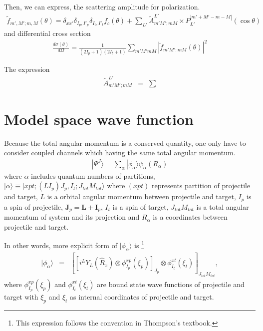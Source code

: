 \documentclass[11pt]{book}
\def\bm{\boldsymbol}
\def\ra{\rangle}
\newcommand{\bea}{\begin{eqnarray}}
\newcommand{\eea}{\end{eqnarray}}
\begin{document}
Then, we can express, the scattering amplitude for polarization.
\bea 
\tilde{f}_{m',M'; m, M}(\theta)=\delta_{xx'}\delta_{I_p,I'_p}\delta_{I_t,I'_t} f_c(\theta)
                       +\sum_{L'} \tilde{A}^{L'}_{m' M';m M}\times P_{L'}^{|m'+M'-m-M|}(\cos\theta)   
\eea 
and differential cross section 
\bea 
\frac{d\sigma(\theta)}{d\Omega} =\frac{1}{(2 I_p+1)(2I_t+1)}\sum_{m' M' m M} |\tilde{f}_{m' M':mM}(\theta)|^2
\eea 


The expression 
\bea 
\tilde{A}^{L'}_{m' M';m M}
&=& \sum 
\eea 

\section{Model space wave function}
Because the total angular momentum is a conserved quantity,
one only have to consider coupled channels which having the same total angular momentum.
\bea 
|\Psi^J\ra =\sum_\alpha |\phi_\alpha\ra \psi_\alpha(R_\alpha)
\eea 
where $\alpha$ includes quantum numbers of partitions,
$|\alpha\ra\equiv |x p t; (L I_p)J_p ,I_t; J_{tot} M_{tot}\ra $
where $(x p t)$ represents partition of projectile and target, $L$ is a orbital angular momentum 
between projectile and target, $I_p$ is a spin of projectile, ${\bm J}_p={\bm L}+{\bm I}_p$,
$I_t$ is a spin of target, $J_{tot} M_{tot}$ is a total angular momentum of system and its projection
and $R_\alpha$ is a coordinates between projectile and target.

In other words, more explicit form of $|\phi_\alpha\ra$ is
\footnote{This expression follows the convention in Thompson's textbook.}    
\bea 
|\phi_\alpha\ra &=&  \left[ \left[i^{L} Y_{L}(\hat{R}_x)\otimes \phi^{xp}_{I_p}(\xi_p)\right]_{J_p} 
\otimes \phi^{xt}_{I_t}(\xi_t)\right]_{J_{tot}M_{tot}},
\eea 
where $\phi^{xp}_{I_p}(\xi_p)$ and $\phi^{xt}_{I_t}(\xi_t)$ are bound state wave functions of 
projectile and target with $\xi_p$ and $\xi_t$ as internal coordinates of projectile and target.
\end{document}
